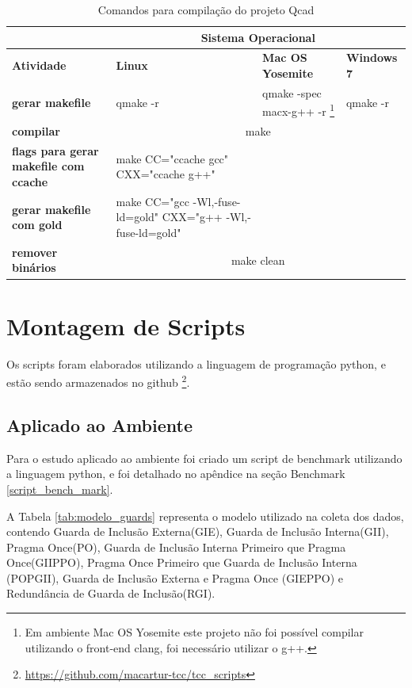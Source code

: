 \begin{itemize}
\begin{table}[h]
\begin{tabular}{p{3cm}p{5cm}p{5cm}p{5cm}}
\toprule
 & \multicolumn{3}{c}{Sistema Operacional} \\ \toprule 
\textbf{Atividade} & \textbf{Linux} & \textbf{Mac OS Yosemite} & \textbf{Windows 7}  \\ \midrule 
\textbf{gerar makefile} & qmake -r & qmake -spec macx-g++ -r  
\footnote{Em ambiente Mac OS Yosemite este projeto não foi possível compilar
 utilizando o front-end clang, foi necessário utilizar o g++.} &  qmake -r  \\ \midrule
\textbf{compilar} & \multicolumn{3}{c}{make } \\ \midrule
\textbf{flags para gerar makefile com ccache} &  make CC="ccache gcc" CXX="ccache g++" \\ \midrule
\textbf{gerar makefile com gold} & make  CC="gcc -Wl,-fuse-ld=gold" CXX="g++ -Wl,-fuse-ld=gold" \\ \midrule
\textbf{remover binários} & \multicolumn{3}{c}{make clean} \\ \bottomrule
\end{tabular} 
\caption{Comandos para compilação do projeto Qcad}
\label{t_compilacao_qcad}
\end{table}

\end{itemize}


\section{Montagem de Scripts}


Os scripts foram elaborados utilizando a linguagem de programação python,
 e estão sendo armazenados no github
\footnote{\url{https://github.com/macartur-tcc/tcc_scripts}}.


\subsection{Aplicado ao Ambiente}\label{Amplicação ao Ambiente}

Para o estudo aplicado ao ambiente foi criado um script de benchmark utilizando
 a linguagem python, e foi detalhado no apêndice na seção Benchmark \ref{script_bench_mark}.

A Tabela \ref{tab:modelo_guards} representa o modelo utilizado na coleta dos dados,
 contendo Guarda de Inclusão Externa(GIE), Guarda de Inclusão Interna(GII),
 Pragma Once(PO), Guarda de Inclusão Interna Primeiro que Pragma Once(GIIPPO),
 Pragma Once Primeiro que Guarda de Inclusão Interna (POPGII),
 Guarda de Inclusão Externa e Pragma Once (GIEPPO) e
 Redundância de Guarda de Inclusão(RGI).

